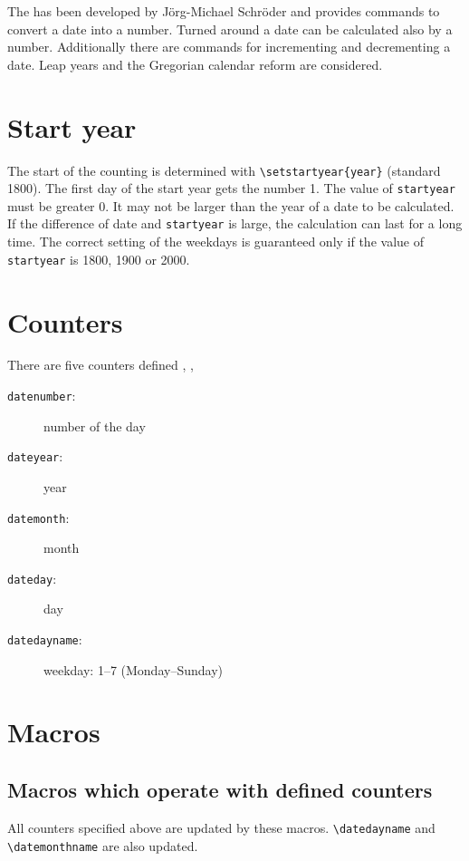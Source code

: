 The  has been developed by J\"org-Michael Schr\"oder and provides commands to convert a date into a number. Turned around a date can be calculated also by a number. Additionally there are commands for incrementing and decrementing a date. Leap years and the Gregorian calendar reform are considered.

\section{Start year}

The start of the counting is determined with \verb+\setstartyear{year}+ (standard 1800). The first day of the start year gets the number 1. The value of \texttt{startyear} must be greater 0. It may not be larger than the year of a date to be calculated. If the difference of date and \texttt{startyear} is large, the calculation can last for a long time. The correct setting of the weekdays is guaranteed only if the value of \texttt{startyear} is 1800, 1900 or 2000.


\section{Counters}
There are five counters defined , , 

\begin{description}
\item[\texttt{datenumber}:] number of the day
\item[\texttt{dateyear}:] year
\item[\texttt{datemonth}:] month
\item[\texttt{dateday}:] day
\item[\texttt{datedayname}:] weekday: 1--7 (Monday--Sunday)
\end{description}


\section{Macros}
\subsection{Macros which operate with defined counters\label{macro}}
All counters specified above are updated by these macros. \verb+\datedayname+ and \verb+\datemonthname+ are also updated.

